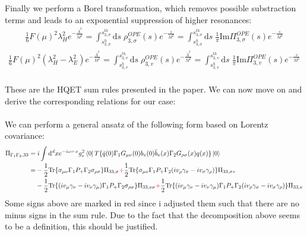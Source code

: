 \documentclass[openright,twoside,12pt,a4paper,final]{article}
\begin{document}
	Finally we perform a Borel transformation, which removes possible substraction terms and leads to an exponential suppression of higher resonances:\\
	\begin{align}
		\frac{1}{6} F(\mu)^2 \lambda_H^2 e^{-\frac{\bar{\Lambda}^2}{M^2}} = \int_{s_{3,\sigma}^h}^{s_{3,\sigma}^{th}} \mathrm{d}s \;  \rho_{3,\sigma}^{OPE}(s) e^{-\frac{s}{M^2}} = \int_{s_{3,\sigma}^h}^{s_{3,\sigma}^{th}} \mathrm{d}s \; \frac{1}{\pi} \mathrm{Im} \Pi_{3,\sigma}^{OPE}(s) e^{-\frac{s}{M^2}}
	\end{align} 
	\begin{align}
		\frac{1}{6} F(\mu)^2 (\lambda_H^2 - \lambda_E^2) e^{-\frac{\bar{\Lambda}^2}{M^2}} = \int_{s_{3,v}^h}^{s_{3,v}^{th}} \mathrm{d}s \;  \rho_{3,v}^{OPE}(s) e^{-\frac{\bar{\Lambda}^2}{M^2}} = \int_{s_{3,v}^h}^{s_{3,v}^{th}} \mathrm{d}s \; \frac{1}{\pi} \mathrm{Im} \Pi_{3,v}^{OPE}(s) e^{-\frac{s}{M^2}}
	\end{align} \\
	These are the HQET sum rules presented in the paper. We can now move on and derive the corresponding relations for our case: \\
	\noindent \\
	We can perform a general ansatz of the following form based on Lorentz covariance:
	\begin{align}
		\Pi_{\Gamma_1 \Gamma_2,33} =& \; i \int \mathrm{d}^d x e^{-i \omega v \cdot x} g_s^2 \bra{0} T\{\bar{q}(0) \Gamma_1 G_{\mu \nu}(0) b_v(0) \bar{b}_v(x) \Gamma_2 G_{\rho \sigma}(x) q(x)\} \ket{0} \nonumber \\ =& -\frac{1}{2} \mathrm{Tr} \{\sigma_{\mu \nu} \Gamma_1 P_+ \Gamma_2\sigma_{\rho \sigma}\} \Pi_{33,\sigma} \textcolor{red}{+} \frac{1}{2} \mathrm{Tr} \{\sigma_{\mu \nu} \Gamma_1 P_+  \Gamma_2 (i v_{\rho} \gamma_{\sigma} - i v_{\sigma} \gamma_{\rho})\} \Pi_{33,\sigma v} \nonumber \\& - \frac{1}{2} \mathrm{Tr} \{(i v_{\mu} \gamma_{\nu} - i v_{\nu} \gamma_{\mu}) \Gamma_1 P_+  \Gamma_2 \sigma_{\rho \sigma}\} \Pi_{33, v \sigma} \textcolor{red}{+} \frac{1}{2} \mathrm{Tr} \{(i v_{\mu} \gamma_{\nu} - i v_{\nu} \gamma_{\mu}) \Gamma_1 P_+  \Gamma_2 (i v_{\rho} \gamma_{\sigma} - i v_{\sigma} \gamma_{\rho})\} \Pi_{33,v}
	\end{align}
	Some signs above are marked in red since i adjusted them such that there are no minus signs in the sum rule. Due to the fact that the decomposition above seems to be a definition, this should be justified. \\
\end{document}

